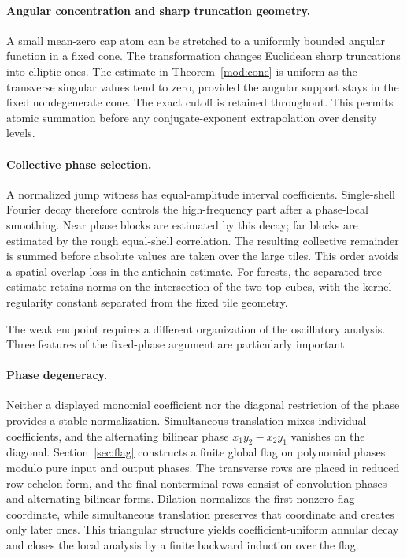 \documentclass[11pt]{article}
\numberwithin{equation}{section}
\theoremstyle{remark}
\theoremstyle{definition}
\begin{document}
\paragraph{Angular concentration and sharp truncation geometry.}
A small mean-zero cap atom can be stretched to a uniformly bounded
angular function in a fixed cone. The transformation changes Euclidean
sharp truncations into elliptic ones. The estimate in
Theorem~\ref{mod:cone} is uniform as the transverse singular values tend
to zero, provided the angular support stays in the fixed nondegenerate
cone. The exact cutoff is retained throughout. This permits atomic
summation before any conjugate-exponent extrapolation over density
levels.

\paragraph{Collective phase selection.}
A normalized jump witness has equal-amplitude interval coefficients.
Single-shell Fourier decay therefore controls the high-frequency part
after a phase-local smoothing. Near phase blocks are estimated by this
decay; far blocks are estimated by the rough equal-shell correlation.
The resulting collective remainder is summed before absolute values are
taken over the large tiles. This order avoids a spatial-overlap loss in the antichain estimate. For forests, the separated-tree estimate
retains norms on the intersection of the two top cubes, with the kernel
regularity constant separated from the fixed tile geometry.

The weak endpoint requires a different organization of the oscillatory
analysis. Three features of the fixed-phase argument are particularly
important.

\paragraph{Phase degeneracy.}
Neither a displayed monomial coefficient nor the diagonal restriction of
the phase provides a stable normalization.  Simultaneous translation mixes
individual coefficients, and the alternating bilinear phase
$x_1y_2-x_2y_1$ vanishes on the diagonal.  Section~\ref{sec:flag}
constructs a finite global flag on polynomial phases modulo pure input and
output phases.  The transverse rows are placed in reduced row-echelon
form, and the final nonterminal rows consist of convolution phases and
alternating bilinear forms.  Dilation normalizes the first nonzero flag
coordinate, while simultaneous translation preserves that coordinate and
creates only later ones.  This triangular structure yields
coefficient-uniform annular decay and closes the local analysis by a finite
backward induction over the flag.
\end{document}
